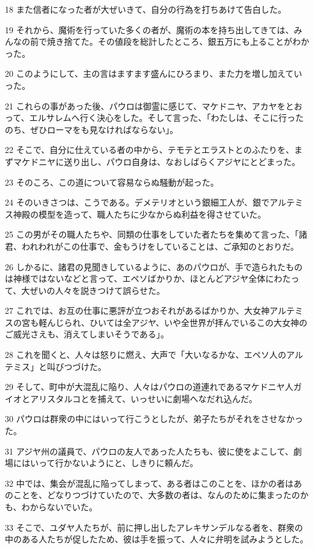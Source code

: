 \par 18 また信者になった者が大ぜいきて、自分の行為を打ちあけて告白した。
\par 19 それから、魔術を行っていた多くの者が、魔術の本を持ち出してきては、みんなの前で焼き捨てた。その値段を総計したところ、銀五万にも上ることがわかった。
\par 20 このようにして、主の言はますます盛んにひろまり、また力を増し加えていった。
\par 21 これらの事があった後、パウロは御霊に感じて、マケドニヤ、アカヤをとおって、エルサレムへ行く決心をした。そして言った、「わたしは、そこに行ったのち、ぜひローマをも見なければならない」。
\par 22 そこで、自分に仕えている者の中から、テモテとエラストとのふたりを、まずマケドニヤに送り出し、パウロ自身は、なおしばらくアジヤにとどまった。
\par 23 そのころ、この道について容易ならぬ騒動が起った。
\par 24 そのいきさつは、こうである。デメテリオという銀細工人が、銀でアルテミス神殿の模型を造って、職人たちに少なからぬ利益を得させていた。
\par 25 この男がその職人たちや、同類の仕事をしていた者たちを集めて言った、「諸君、われわれがこの仕事で、金もうけをしていることは、ご承知のとおりだ。
\par 26 しかるに、諸君の見聞きしているように、あのパウロが、手で造られたものは神様ではないなどと言って、エペソばかりか、ほとんどアジヤ全体にわたって、大ぜいの人々を説きつけて誤らせた。
\par 27 これでは、お互の仕事に悪評が立つおそれがあるばかりか、大女神アルテミスの宮も軽んじられ、ひいては全アジヤ、いや全世界が拝んでいるこの大女神のご威光さえも、消えてしまいそうである」。
\par 28 これを聞くと、人々は怒りに燃え、大声で「大いなるかな、エペソ人のアルテミス」と叫びつづけた。
\par 29 そして、町中が大混乱に陥り、人々はパウロの道連れであるマケドニヤ人ガイオとアリスタルコとを捕えて、いっせいに劇場へなだれ込んだ。
\par 30 パウロは群衆の中にはいって行こうとしたが、弟子たちがそれをさせなかった。
\par 31 アジヤ州の議員で、パウロの友人であった人たちも、彼に使をよこして、劇場にはいって行かないようにと、しきりに頼んだ。
\par 32 中では、集会が混乱に陥ってしまって、ある者はこのことを、ほかの者はあのことを、どなりつづけていたので、大多数の者は、なんのために集まったのかも、わからないでいた。
\par 33 そこで、ユダヤ人たちが、前に押し出したアレキサンデルなる者を、群衆の中のある人たちが促したため、彼は手を振って、人々に弁明を試みようとした。
